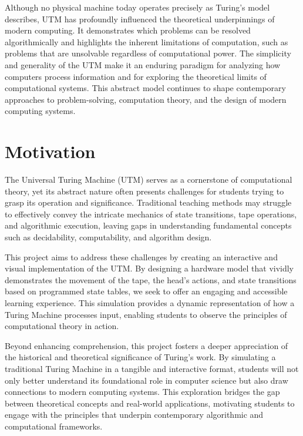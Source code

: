 Although no physical machine today operates precisely as Turing's model describes, UTM has profoundly influenced the theoretical underpinnings of modern computing. It demonstrates which problems can be resolved algorithmically and highlights the inherent limitations of computation, such as problems that are unsolvable regardless of computational power. The simplicity and generality of the UTM make it an enduring paradigm for analyzing how computers process information and for exploring the theoretical limits of computational systems. This abstract model continues to shape contemporary approaches to problem-solving, computation theory, and the design of modern computing systems.

\section{Motivation}

The Universal Turing Machine (UTM) serves as a cornerstone of computational theory, yet its abstract nature often presents challenges for students trying to grasp its operation and significance. Traditional teaching methods may struggle to effectively convey the intricate mechanics of state transitions, tape operations, and algorithmic execution, leaving gaps in understanding fundamental concepts such as decidability, computability, and algorithm design.

This project aims to address these challenges by creating an interactive and visual implementation of the UTM. By designing a hardware model that vividly demonstrates the movement of the tape, the head’s actions, and state transitions based on programmed state tables, we seek to offer an engaging and accessible learning experience. This simulation provides a dynamic representation of how a Turing Machine processes input, enabling students to observe the principles of computational theory in action.

Beyond enhancing comprehension, this project fosters a deeper appreciation of the historical and theoretical significance of Turing’s work. By simulating a traditional Turing Machine in a tangible and interactive format, students will not only better understand its foundational role in computer science but also draw connections to modern computing systems. This exploration bridges the gap between theoretical concepts and real-world applications, motivating students to engage with the principles that underpin contemporary algorithmic and computational frameworks.

